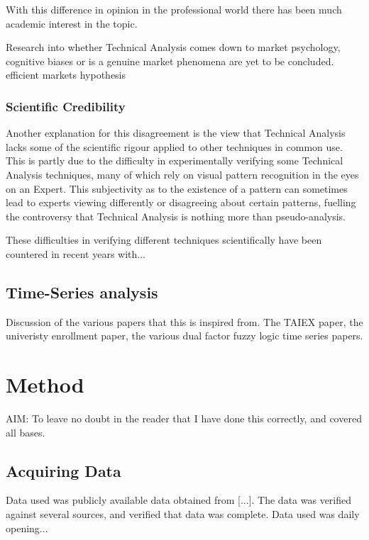 \documentclass{article}
\begin{document}
With this difference in opinion in the professional world there has been much academic interest in the topic.

Research into whether Technical Analysis comes down to market psychology, cognitive biases or is a genuine market phenomena are yet to be concluded. efficient markets hypothesis

\subsubsection{Scientific Credibility}

Another explanation for this disagreement is the view that Technical Analysis lacks some of the scientific rigour applied to other techniques in common use. This is partly due to the difficulty in experimentally verifying some Technical Analysis techniques, many of which rely on visual pattern recognition in the eyes on an Expert. This subjectivity as to the existence of a pattern can sometimes lead to experts viewing differently or disagreeing about certain patterns, fuelling the controversy that Technical Analysis is nothing more than pseudo-analysis.

These difficulties in verifying different techniques scientifically have been countered in recent years with...

\subsection{Time-Series analysis}

Discussion of the various papers that this is inspired from. The TAIEX paper, the univeristy enrollment paper,  the various dual factor fuzzy logic time series papers.

\section{Method}

AIM: To leave no doubt in the reader that I have done this correctly, and covered all bases.

\subsection{Acquiring Data}

Data used was publicly available data obtained from [...]. The data was verified against several sources, and verified that data was complete. Data used was daily opening...
\end{document}
